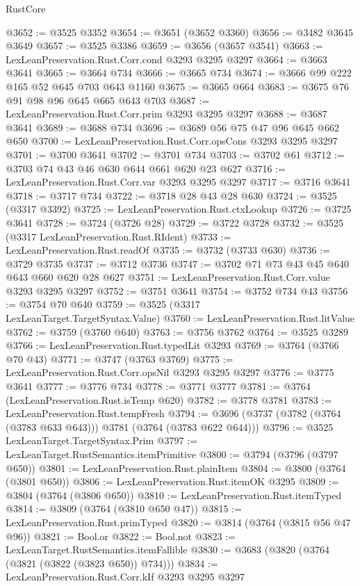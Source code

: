 \begin{lexlean}{RustCore}
\begin{coremodule}
@3652 := @3525 @3352
@3654 := @3651 (@3652 @3360)
@3656 := @3482 @3645 @3649
@3657 := @3525 @3386
@3659 := @3656 (@3657 @3541)
@3663 := LexLeanPreservation.Rust.Corr.cond @3293 @3295 @3297
@3664 := @3663 @3641
@3665 := @3664 @734
@3666 := @3665 @734
@3674 := @3666 @99 @222 @165 @52 @645 @703 @643 @1160
@3675 := @3665 @664
@3683 := @3675 @76 @91 @98 @96 @645 @665 @643 @703
@3687 := LexLeanPreservation.Rust.Corr.prim @3293 @3295 @3297
@3688 := @3687 @3641
@3689 := @3688 @734
@3696 := @3689 @56 @75 @47 @96 @645 @662 @650
@3700 := LexLeanPreservation.Rust.Corr.opsCons @3293 @3295 @3297
@3701 := @3700 @3641
@3702 := @3701 @734
@3703 := @3702 @61
@3712 := @3703 @74 @43 @46 @630 @644 @661 @620 @23 @627
@3716 := LexLeanPreservation.Rust.Corr.var @3293 @3295 @3297
@3717 := @3716 @3641
@3718 := @3717 @734
@3722 := @3718 @28 @43 @28 @630
@3724 := @3525 (@3317 @3392)
@3725 := LexLeanPreservation.Rust.ctxLookup
@3726 := @3725 @3641
@3728 := @3724 (@3726 @28)
@3729 := @3722 @3728
@3732 := @3525 (@3317 LexLeanPreservation.Rust.RIdent)
@3733 := LexLeanPreservation.Rust.readOf
@3735 := @3732 (@3733 @630)
@3736 := @3729 @3735
@3737 := @3712 @3736
@3747 := @3702 @71 @73 @43 @45 @640 @643 @660 @620 @28 @627
@3751 := LexLeanPreservation.Rust.Corr.value @3293 @3295 @3297
@3752 := @3751 @3641
@3754 := @3752 @734 @43
@3756 := @3754 @70 @640
@3759 := @3525 (@3317 LexLeanTarget.TargetSyntax.Value)
@3760 := LexLeanPreservation.Rust.litValue
@3762 := @3759 (@3760 @640)
@3763 := @3756 @3762
@3764 := @3525 @3289
@3766 := LexLeanPreservation.Rust.typedLit @3293
@3769 := @3764 (@3766 @70 @43)
@3771 := @3747 (@3763 @3769)
@3775 := LexLeanPreservation.Rust.Corr.opsNil @3293 @3295 @3297
@3776 := @3775 @3641
@3777 := @3776 @734
@3778 := @3771 @3777
@3781 := @3764 (LexLeanPreservation.Rust.isTemp @620)
@3782 := @3778 @3781
@3783 := LexLeanPreservation.Rust.tempFresh
@3794 := @3696 (@3737 (@3782 (@3764 (@3783 @633 @643))) @3781 (@3764 (@3783 @622 @644)))
@3796 := @3525 LexLeanTarget.TargetSyntax.Prim
@3797 := LexLeanTarget.RustSemantics.itemPrimitive
@3800 := @3794 (@3796 (@3797 @650))
@3801 := LexLeanPreservation.Rust.plainItem
@3804 := @3800 (@3764 (@3801 @650))
@3806 := LexLeanPreservation.Rust.itemOK @3295
@3809 := @3804 (@3764 (@3806 @650))
@3810 := LexLeanPreservation.Rust.itemTyped
@3814 := @3809 (@3764 (@3810 @650 @47))
@3815 := LexLeanPreservation.Rust.primTyped
@3820 := @3814 (@3764 (@3815 @56 @47 @96))
@3821 := Bool.or
@3822 := Bool.not
@3823 := LexLeanTarget.RustSemantics.itemFallible
@3830 := @3683 (@3820 (@3764 (@3821 (@3822 (@3823 @650)) @734)))
@3834 := LexLeanPreservation.Rust.Corr.kIf @3293 @3295 @3297

\end{coremodule}
\end{lexlean}
